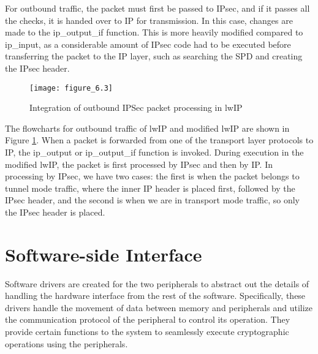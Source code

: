 For outbound traffic, the packet must first be passed to IPsec, and if it passes all the checks, it is handed over to IP for transmission. In this case, changes are made to the ip\_output\_if function. This is more heavily modified compared to ip\_input, as a considerable amount of IPsec code had to be executed before transferring the packet to the IP layer, such as searching the SPD and creating the IPsec header.

\begin{figure}
\centering
\texttt{[image: figure\_6.3]}\\
\caption{  Integration of outbound IPSec packet processing in lwIP }
\label{fig:figure_6.3}
\end{figure}

The flowcharts for outbound traffic of lwIP and modified lwIP are shown in Figure \ref{fig:figure_6.3}. When a packet is forwarded from one of the transport layer protocols to IP, the ip\_output or ip\_output\_if function is invoked. During execution in the modified lwIP, the packet is first processed by IPsec and then by IP. In processing by IPsec, we have two cases: the first is when the packet belongs to tunnel mode traffic, where the inner IP header is placed first, followed by the IPsec header, and the second is when we are in transport mode traffic, so only the IPsec header is placed.


\section{Software-side Interface}
Software drivers are created for the two peripherals to abstract out the details of handling the hardware interface from the rest of the software. Specifically, these drivers handle the movement of data between memory and peripherals and utilize the communication protocol of the peripheral to control its operation. They provide certain functions to the system to seamlessly execute cryptographic operations using the peripherals.

